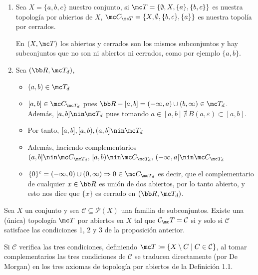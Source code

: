 \begin{ejem}
\begin{enumerate}
    \item Sea $X=\{a,b,c\}$ nuestro conjunto, si $\mc T=\{\emptyset, X, \{a\},\{b,c\}\}$ es nuestra topolog\'ia por abiertos de $X$, $\mc C_{\mc T} = \{X, \emptyset,\{b,c\},\{a\}\}$ es nuestra topol\'ia por cerrados.
    
    En $(X,\mc T)$ los abiertos y cerrados son los mismos subconjuntos y hay subconjuntos que no son ni abiertos ni cerrados, como por ejemplo $\{a,b\}$.
    \item Sea $(\bb R, \mc T_d)$,
    \begin{itemize}
        \item $(a,b) \in \mc T_d$
        \item $[a,b] \in \mc C_{\mc T_d}$ pues $\bb R - [a,b] = (-\infty,a) \cup(b,\infty) \in \mc T_d$. Adem\'as, $[a,b]\nin \mc T_d$ pues tomando $a\in [a,b] \, \nexists \, B(a, \varepsilon) \subset [a,b]$.
        \item Por tanto, $ [a,b],[a,b),(a,b] \nin \mc T_d$
        \item Adem\'as, haciendo complementarios $(a,b] \nin \mc C_{\mc T_d}, \, [a,b) \nin \mc C_{\mc T_d}, \, (-\infty, a] \nin \mc C_{\mc T_d}$
        \item $\{0\}^c=(-\infty,0) \cup (0,\infty) \Rightarrow 0 \in \mc C_{\mc T_d}$ es decir, que el complementario de cualquier $x\in \bb R$ es uni\'on de dos abiertos, por lo tanto abierto, y esto nos dice que $\{x\}$ es cerrado en $(\bb R, \mc T_d)$.
    \end{itemize}
\end{enumerate}
\end{ejem}

\begin{teo}
Sea \(X\) un conjunto y sea \(\mathcal{C} \subseteq \mathcal{P}(X)\) una familia de subconjuntos. Existe una (única) topología \(\mc T\) por abiertos en \(X\) tal que \(\mathcal{C}_\mc T = \mathcal{C}\) si y solo si \(\mathcal{C}\) satisface las condiciones 1, 2 y 3 de la proposición anterior.
\end{teo}

\begin{dem}
Si \(\mathcal{C}\) verifica las tres condiciones, definiendo \(\mc T \coloneqq \{X \setminus C \mid C \in \mathcal{C}\}\), al tomar complementarios las tres condiciones de \(\mathcal{C}\) se traducen directamente (por De Morgan) en los tres axiomas de topología por abiertos de la Definición 1.1.
\end{dem}

